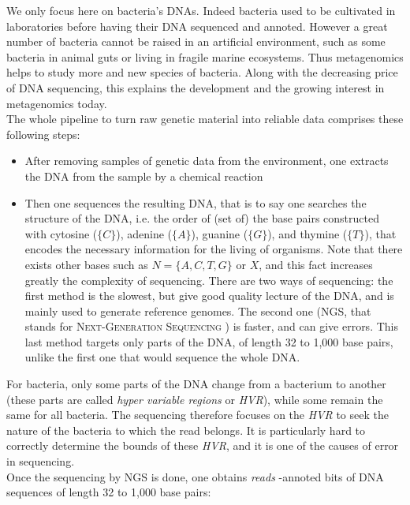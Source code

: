 \documentclass{report}
\begin{document}
We only focus here on bacteria's DNAs. Indeed bacteria used to be cultivated in laboratories before having their DNA sequenced and annoted. However a great number of bacteria cannot be raised in an artificial environment, such as some bacteria in animal guts or living in fragile marine ecosystems. Thus metagenomics helps to study more and new species of bacteria. Along with the decreasing price of DNA sequencing, this explains the development and the growing interest in metagenomics today.\\

The whole pipeline to turn raw genetic material into reliable data comprises these following steps:
\begin{itemize}
\item After removing samples of genetic data from the environment, one extracts the DNA from the sample by a chemical reaction
\item Then one sequences the resulting DNA, that is to say one searches the structure of the DNA, i.e. the order of (set of) the base pairs constructed with cytosine ($\{C\}$), adenine ($\{A\}$), guanine ($\{G\}$), and thymine ($\{T\}$), that encodes the necessary information for the living of organisms. Note that there exists other bases such as $N = \{A,C,T,G\}$ or $X$, and this fact increases greatly the complexity of sequencing. There are two ways of sequencing: the first method is the slowest, but give good quality lecture of the DNA, and is mainly used to generate reference genomes. The second one (\textsc{NGS}, that stands for \textsc{Next-Generation Sequencing} \cite{WikiNGS}) is faster, and can give errors. This last method targets only parts of the DNA, of length 32 to 1,000 base pairs, unlike the first one that would sequence the whole DNA.
\end{itemize}

For bacteria, only some parts of the DNA change from a bacterium to another (these parts are called \emph{hyper variable regions} or \emph{HVR}), while some remain the same for all bacteria. The sequencing therefore focuses on the \emph{HVR} to seek the nature of the bacteria to which the read belongs. It is particularly hard to correctly determine the bounds of these \emph{HVR}, and it is one of the causes of error in sequencing.\\

Once the sequencing by \textsc{NGS} is done, one obtains \emph{reads} -annoted bits of DNA sequences of length 32 to 1,000 base pairs:\\
\end{document}
